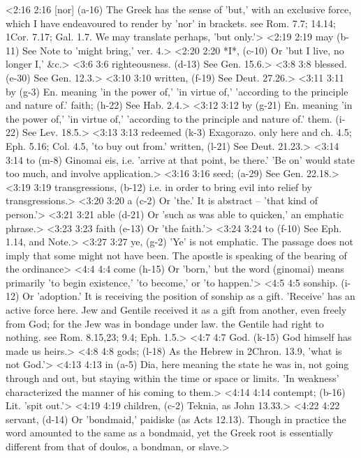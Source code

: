 <2:16 2:16  [nor] (a-16)  The Greek has the sense of 'but,' with an exclusive force,  which I have endeavoured to render by 'nor' in brackets. see  Rom. 7.7; 14.14; 1Cor. 7.17; Gal. 1.7. We may translate  perhaps, 'but only.'>
<2:19 2:19  may (b-11)  See Note to 'might bring,' ver. 4.>
<2:20 2:20  *I*, (c-10)  Or 'but I live, no longer I,' &c.>
<3:6 3:6  righteousness. (d-13)  See Gen. 15.6.>
<3:8 3:8  blessed. (e-30)  See Gen. 12.3.>
<3:10 3:10  written, (f-19)  See Deut. 27.26.>
<3:11 3:11  by (g-3)  En. meaning 'in the power of,' 'in virtue of,' 'according  to the principle and nature of.'
  faith; (h-22)  See Hab. 2.4.>
<3:12 3:12  by (g-21)  En. meaning 'in the power of,' 'in virtue of,' 'according  to the principle and nature of.'
  them. (i-22)  See Lev. 18.5.>
<3:13 3:13  redeemed (k-3)  Exagorazo. only here and ch. 4.5; Eph. 5.16; Col. 4.5, 'to  buy out from.'
  written, (l-21)  See Deut. 21.23.>
<3:14 3:14  to (m-8)  Ginomai eis, i.e. 'arrive at that point, be there.' 'Be on'  would state too much, and involve application.>
<3:16 3:16  seed; (a-29)  See Gen. 22.18.>
<3:19 3:19  transgressions, (b-12)  i.e. in order to bring evil into relief by transgressions.>
<3:20 3:20  a (c-2)  Or 'the.' It is abstract -- 'that kind of person.'>
<3:21 3:21  able (d-21)  Or 'such as was able to quicken,' an emphatic phrase.>
<3:23 3:23  faith (e-13)  Or 'the faith.'>
<3:24 3:24  to (f-10)  See Eph. 1.14, and Note.>
<3:27 3:27  ye, (g-2)  'Ye' is not emphatic. The passage does not imply that some  might not have been. The apostle is speaking of the bearing of  the ordinance>
<4:4 4:4  come (h-15)  Or 'born,' but the word (ginomai) means primarily 'to begin  existence,' 'to become,' or 'to happen.'>
<4:5 4:5  sonship. (i-12)  Or 'adoption.' It is receiving the position of sonship as a  gift. 'Receive' has an active force here. Jew and Gentile  received it as a gift from another, even freely from God; for  the Jew was in bondage under law. the Gentile had right to  nothing. see Rom. 8.15,23; 9.4; Eph. 1.5.>
<4:7 4:7  God. (k-15)  God himself has made us heirs.>
<4:8 4:8  gods; (l-18)  As the Hebrew in 2Chron. 13.9, 'what is not God.'>
<4:13 4:13  in (a-5)  Dia, here meaning the state he was in, not going through  and out, but staying within the time or space or limits. 'In  weakness' characterized the manner of his coming to them.>
<4:14 4:14  contempt; (b-16)  Lit. 'spit out.'>
<4:19 4:19  children, (c-2)  Teknia, as John 13.33.>
<4:22 4:22  servant, (d-14)  Or 'bondmaid,' paidiske (as Acts 12.13). Though in practice  the word amounted to the same as a bondmaid, yet the Greek root  is essentially different from that of doulos, a bondman, or  slave.>
